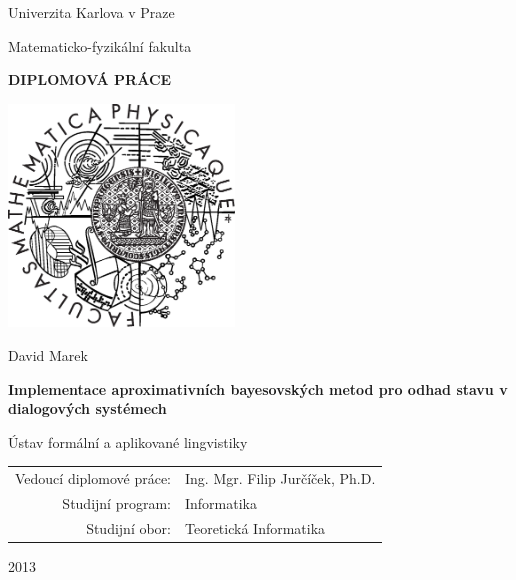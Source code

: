 \documentclass[12pt,a4paper]{report}
\begin{document}



\pagestyle{empty}
\begin{center}

\large

Univerzita Karlova v Praze

\medskip

Matematicko-fyzikální fakulta

\vfill

{\bf\Large DIPLOMOVÁ PRÁCE}

\vfill

\centerline{\mbox{\includegraphics[width=60mm]{../img/logo.eps}}}

\vfill
\vspace{5mm}

{\LARGE David Marek}

\vspace{15mm}

{\LARGE\bfseries Implementace aproximativních bayesovských metod pro odhad stavu v dialogových systémech}

\vfill

Ústav formální a aplikované lingvistiky

\vfill

\begin{tabular}{rl}

Vedoucí diplomové práce: & Ing. Mgr. Filip Jurčíček, Ph.D. \\
\noalign{\vspace{2mm}}
Studijní program: & Informatika \\
\noalign{\vspace{2mm}}
Studijní obor: & Teoretická Informatika \\
\end{tabular}

\vfill

2013

\end{center}
\end{document}
